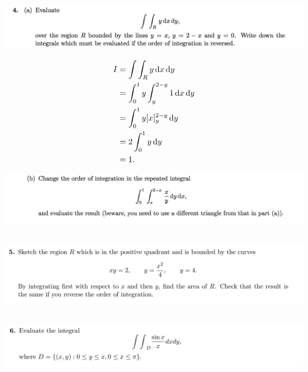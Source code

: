 \documentclass[12pt]{article}
\begin{document}
\newpage
\subsection{}

\begin{mdframed}
  \includegraphics[width=400pt]{img/oxford-prelims-M5-multivariable-calc-1-4-a.png}
\end{mdframed}

\begin{align*}
  I &= \int\int_R y \dx \dy \\
    &= \int_0^1 y \int_y^{2-y} 1 \dx \dy \\
    &= \int_0^1 y [x]_y^{2-y} \dy \\
    &= 2\int_0^1 y \dy \\
    &= 1.
\end{align*}

\begin{mdframed}
  \includegraphics[width=400pt]{img/oxford-prelims-M5-multivariable-calc-1-4-b.png}
\end{mdframed}

\subsection{}
\begin{mdframed}
  \includegraphics[width=400pt]{img/oxford-prelims-M5-multivariable-calc-1-5.png}
\end{mdframed}

\subsection{}
\begin{mdframed}
  \includegraphics[width=400pt]{img/oxford-prelims-M5-multivariable-calc-1-6.png}
\end{mdframed}
\end{document}
